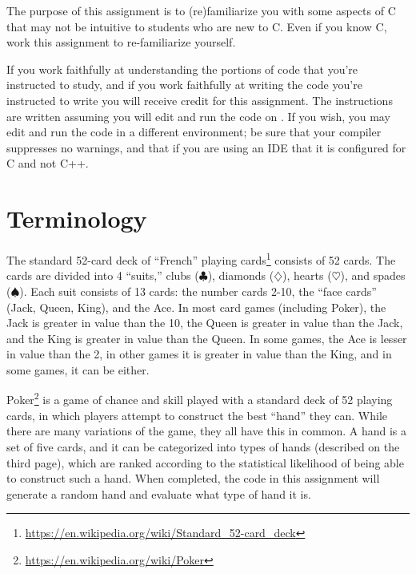 


\renewcommand{\labnumber}{1}
\renewcommand{\labname}{C Programming Familiarization Lab}
\renewcommand{\shortlabname}{pokerlab}
\renewcommand{\collaborationrules}{Except as noted in Section~\ref{studyTheCode}, \individualeffort}
\renewcommand{\duedate}{Week of August 30, before the start of your lab section}
\startdocument
% 



The purpose of this assignment is to (re)familiarize you with some aspects of C
that may not be intuitive to students who are new to C. Even if you know C,
work this assignment to re-familiarize yourself.

If you work faithfully at understanding the portions of code that you're
instructed to study, and if you work faithfully at writing the code you're
instructed to write you will receive credit for this assignment. The
instructions are written assuming you will edit and run the code on
\runtimeenvironment. If you wish, you may edit and run the code
in a different environment; be sure that your compiler suppresses no warnings,
and that if you are using an IDE that it is configured for C and not C++.

\section{Terminology}

The standard 52-card deck of ``French'' playing
cards\footnote{\url{https://en.wikipedia.org/wiki/Standard_52-card_deck}}
consists of 52 cards. The cards are divided into 4 ``suits,'' clubs
($\clubsuit$), diamonds ($\diamondsuit$), hearts ($\heartsuit$), and spades
($\spadesuit$). Each suit consists of 13 cards: the number cards 2-10, the
``face cards'' (Jack, Queen, King), and the Ace. In most card games (including
Poker), the Jack is greater in value than the 10, the Queen is greater in value
than the Jack, and the King is greater in value than the Queen. In some games,
the Ace is lesser in value than the 2, in other games it is greater in value
than the King, and in some games, it can be either.

Poker\footnote{\url{https://en.wikipedia.org/wiki/Poker}} is a game of chance
and skill played with a standard deck of 52 playing cards, in which players
attempt to construct the best ``hand'' they can. While there are many
variations of the game, they all have this in common. A hand is a set of five
cards, and it can be categorized into types of hands (described on the third
page), which are ranked according to the statistical likelihood of being able
to construct such a hand. When completed, the code in this assignment will
generate a random hand and evaluate what type of hand it is.

